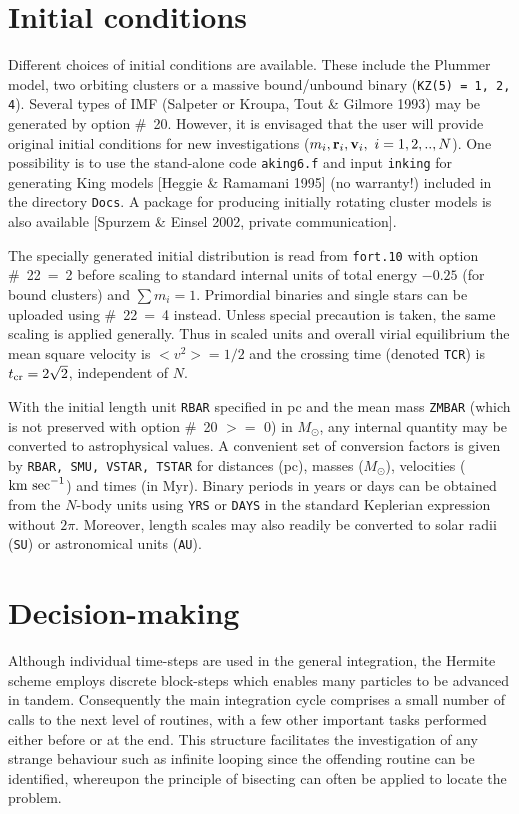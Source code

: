 \documentclass[12pt]{article}
\begin{document}
\section{Initial conditions}

Different choices of initial conditions are available.
These include the Plummer model, two orbiting clusters or a massive
bound/unbound  binary ({\tt KZ(5) = 1, 2, 4}).
Several types of IMF (Salpeter or Kroupa, Tout \& Gilmore 1993) may be
generated by option \#~20.
However, it is envisaged that the user will provide original initial
conditions for new investigations
($m_i, {\bf r}_i, {\bf v}_i, ~i = 1, 2, .., N$).
One possibility is to use the stand-alone code {\tt aking6.f} and input
{\tt inking} for generating King models [Heggie \& Ramamani 1995]
(no warranty!) included in the directory {\tt Docs}.
A package for producing initially rotating cluster models is also available
[Spurzem \& Einsel 2002, private communication].

The specially generated initial distribution is read from {\tt fort.10} with
option \#~22~=~2 before scaling to standard internal units of total energy
$-0.25$ (for bound clusters) and $\sum m_i = 1$.
Primordial binaries and single stars can be uploaded using \#~22~=~4 instead.
Unless special precaution is taken, the same scaling is applied generally.
Thus in scaled units and overall virial equilibrium the mean square velocity
is $<v^2> = 1/2$ and the crossing time (denoted {\tt TCR}) is
$t_{\rm cr} = 2 \sqrt 2$, independent of $N$.

With the initial length unit {\tt RBAR} specified in pc and the mean mass
{\tt ZMBAR} (which is not preserved with option \#~20 $>=$ 0) in
$M_{\odot}$, any internal quantity may be converted to astrophysical values.
A convenient set of conversion factors is given by
{\tt RBAR, SMU, VSTAR, TSTAR} for distances (pc), masses
($M_{\odot}$), velocities (${\rm km~sec}^{-1}$) and times (in Myr).
Binary periods in years or days can be obtained from the $N$-body units
using {\tt YRS} or {\tt DAYS} in the standard Keplerian expression without
$2 \pi$.
Moreover, length scales may also readily be converted to solar radii
({\tt SU}) or astronomical units ({\tt AU}).

\section{Decision-making}

Although individual time-steps are used in the general integration, the 
Hermite scheme employs discrete block-steps which enables many particles to
be advanced in tandem.
Consequently the main integration cycle comprises a small number of calls
to the next level of routines, with a few other important tasks performed
either before or at the end.
This structure facilitates the investigation of any strange behaviour such
as infinite looping since the offending routine can be identified, whereupon
the principle of bisecting can often be applied to locate the problem.
\end{document}
